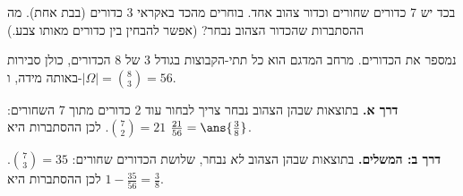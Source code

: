 בכד יש 7 כדורים שחורים וכדור צהוב אחד. בוחרים מהכד באקראי 3 כדורים (בבת אחת). מה ההסתברות שהכדור הצהוב נבחר? (אפשר להבחין בין כדורים מאותו צבע.)
\begin{solbox}
נמספר את הכדורים. מרחב המדגם הוא כל תתי-הקבוצות בגודל 3 של 8 הכדורים, כולן סבירות באותה מידה, ו-$|\Omega|=\binom83=56$.

\textbf{דרך א.} בתוצאות שבהן הצהוב נבחר צריך לבחור עוד 2 כדורים מתוך 7 השחורים: $\binom72=21$. לכן ההסתברות היא $\frac{21}{56}=\ans{\frac38}$.

\textbf{דרך ב: המשלים.} בתוצאות שבהן הצהוב \emph{לא} נבחר, שלושת הכדורים שחורים: $\binom73=35$. לכן ההסתברות היא $1-\frac{35}{56}=\frac38$.
\end{solbox}
